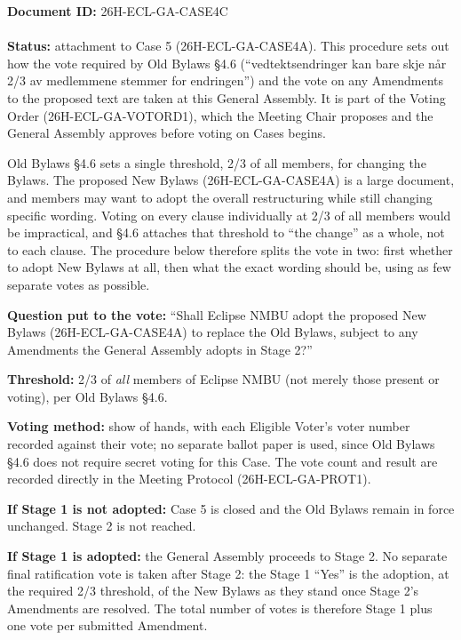 \documentclass{../../../Common/Latex/Templates/rapport}
\date{\meetingdate, \meetingtime}
\begin{document}
\makecoverpage
\tableofcontents
\reportmainmatter

\noindent\textbf{Document ID:} 26H-ECL-GA-CASE4C\\
\meetingline\\
\textbf{Status:} attachment to Case 5 (26H-ECL-GA-CASE4A). This procedure sets out how the vote required by Old Bylaws \S4.6 (``vedtektsendringer kan bare skje når 2/3 av medlemmene stemmer for endringen'') and the vote on any Amendments to the proposed text are taken at this General Assembly. It is part of the Voting Order (26H-ECL-GA-VOTORD1), which the Meeting Chair proposes and the General Assembly approves before voting on Cases begins.

Old Bylaws \S4.6 sets a single threshold, 2/3 of all members, for changing the Bylaws. The proposed New Bylaws (26H-ECL-GA-CASE4A) is a large document, and members may want to adopt the overall restructuring while still changing specific wording. Voting on every clause individually at 2/3 of all members would be impractical, and \S4.6 attaches that threshold to ``the change'' as a whole, not to each clause. The procedure below therefore splits the vote in two: first whether to adopt New Bylaws at all, then what the exact wording should be, using as few separate votes as possible.

\textbf{Question put to the vote:} ``Shall Eclipse NMBU adopt the proposed New Bylaws (26H-ECL-GA-CASE4A) to replace the Old Bylaws, subject to any Amendments the General Assembly adopts in Stage 2?''

\textbf{Threshold:} 2/3 of \emph{all} members of Eclipse NMBU (not merely those present or voting), per Old Bylaws \S4.6.

\textbf{Voting method:} show of hands, with each Eligible Voter's voter number recorded against their vote; no separate ballot paper is used, since Old Bylaws \S4.6 does not require secret voting for this Case. The vote count and result are recorded directly in the Meeting Protocol (26H-ECL-GA-PROT1).

\textbf{If Stage 1 is not adopted:} Case 5 is closed and the Old Bylaws remain in force unchanged. Stage 2 is not reached.

\textbf{If Stage 1 is adopted:} the General Assembly proceeds to Stage 2. No separate final ratification vote is taken after Stage 2: the Stage 1 ``Yes'' is the adoption, at the required 2/3 threshold, of the New Bylaws as they stand once Stage 2's Amendments are resolved. The total number of votes is therefore Stage 1 plus one vote per submitted Amendment.
\end{document}
